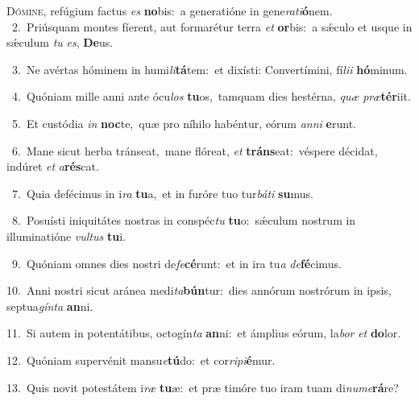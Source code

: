 \lettrine{\initial\textcolor{\initialcolor}{D}}{ómine,} refúgium factus \textit{es} \textbf{no}\-bis:~\star a generatióne in gene\-\textit{ra}\-\textit{ti}\textbf{ó}nem.\\
{\numbfont\textcolor{\numbcolor}{~2.}}~Priúsquam montes fíerent, aut formarétur terra \textit{et} \textbf{or}\-bis:~\star a sǽculo et usque in sǽculum \textit{tu} \textit{es}\-, \textbf{De}\-us.\par
{\numbfont\textcolor{\numbcolor}{~3.}}~Ne avértas hóminem in humi\-\textit{li}\-\textbf{tá}tem:~\star et dixísti: Convertímini, fí\-\textit{li}\-\textit{i} \textbf{hó}\-minum.\par
{\numbfont\textcolor{\numbcolor}{~4.}}~Quóniam mille anni ante ócu\textit{los} \textbf{tu}\-os,~\star tamquam dies hestérna, \textit{quæ} \textit{præ}\-\textbf{tér}iit.\par
{\numbfont\textcolor{\numbcolor}{~5.}}~Et custódia \textit{in} \textbf{noc}\-te,~\star quæ pro níhilo habéntur, eórum \textit{an}\-\textit{ni} \textbf{e}\-runt.\par
{\numbfont\textcolor{\numbcolor}{~6.}}~Mane sicut herba tránseat,~\dagger mane flóreat, \textit{et} \textbf{tráns}\-eat:~\star véspere décidat, indúret \textit{et} \textit{a}\-\textbf{rés}cat.\par
{\numbfont\textcolor{\numbcolor}{~7.}}~Quia defécimus in i\textit{ra} \textbf{tu}\-a,~\star et in furóre tuo tur\-\textit{bá}\-\textit{ti} \textbf{su}\-mus.\par
{\numbfont\textcolor{\numbcolor}{~8.}}~Posuísti iniquitátes nostras in conspéc\textit{tu} \textbf{tu}\-o:~\star sǽculum nostrum in illuminatióne \textit{vul}\-\textit{tus} \textbf{tu}\-i.\par
{\numbfont\textcolor{\numbcolor}{~9.}}~Quóniam omnes dies nostri de\-\textit{fe}\-\textbf{cé}runt:~\star et in ira tu\textit{a} \textit{de}\-\textbf{fé}cimus.\par
{\numbfont\textcolor{\numbcolor}{10.}}~Anni nostri sicut aránea medi\-\textit{ta}\-\textbf{bún}tur:~\star dies annórum nostrórum in ipsis, septua\-\textit{gín}\-\textit{ta} \textbf{an}\-ni.\par
{\numbfont\textcolor{\numbcolor}{11.}}~Si autem in potentátibus, octogín\textit{ta} \textbf{an}\-ni:~\star et ámplius eórum, la\textit{bor} \textit{et} \textbf{do}\-lor.\par
{\numbfont\textcolor{\numbcolor}{12.}}~Quóniam supervénit mansu\-\textit{e}\-\textbf{tú}do:~\star et cor\-\textit{ri}\-\textit{pi}\textbf{é}mur.\par
{\numbfont\textcolor{\numbcolor}{13.}}~Quis novit potestátem i\textit{ræ} \textbf{tu}\-æ:~\star et præ timóre tuo iram tuam di\-\textit{nu}\-\textit{me}\textbf{rá}re?\par
